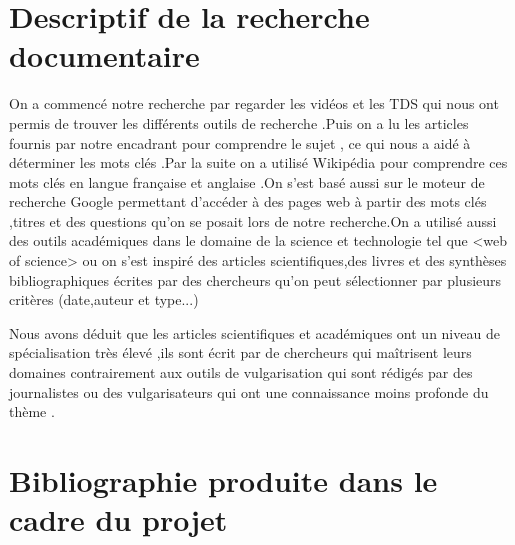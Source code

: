 \documentclass[11pt]{article}
\begin{document}
\begin{flushleft}
\section{Descriptif de la recherche documentaire}
   On a commencé notre recherche  par regarder les vidéos et les TDS  qui nous ont  permis de trouver les différents outils de recherche .Puis on a  lu  les articles fournis par notre encadrant pour  comprendre le sujet , ce qui  nous a aidé à déterminer  les mots clés .Par la suite on a utilisé Wikipédia pour comprendre ces mots clés  en langue française et anglaise .On s’est basé aussi sur le moteur de recherche Google permettant d’accéder à des pages web  à partir des mots clés ,titres et des questions qu’on se posait lors de notre recherche.On a utilisé aussi des outils académiques dans le domaine de la science et technologie tel que <web of science> ou on s’est inspiré des articles scientifiques,des livres et des synthèses  bibliographiques écrites par des chercheurs qu'on peut sélectionner par plusieurs critères (date,auteur et type...)
   
     Nous avons déduit que les articles scientifiques et académiques ont un niveau de spécialisation très élevé ,ils sont écrit par de chercheurs qui maîtrisent leurs domaines contrairement  aux outils de vulgarisation qui sont rédigés par des journalistes ou des vulgarisateurs qui ont une connaissance moins profonde du thème .
\section{Bibliographie produite dans le cadre du projet}

\end{flushleft}
\end{document}
